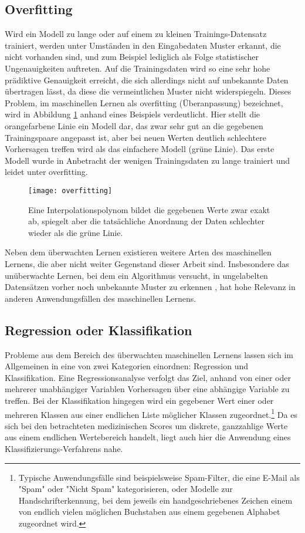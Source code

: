 \subsection{Overfitting}\label{section:overfitting}
Wird ein Modell zu lange oder auf einem zu kleinen Trainings-Datensatz trainiert, werden unter Umständen in den Eingabedaten Muster erkannt, die nicht vorhanden sind, und zum Beispiel lediglich als Folge statistischer Ungenauigkeiten auftreten. Auf die Trainingsdaten wird so eine sehr hohe prädiktive Genauigkeit erreicht, die sich allerdings nicht auf unbekannte Daten übertragen lässt, da diese die vermeintlichen Muster nicht widerspiegeln. Dieses Problem, im maschinellen Lernen als overfitting (Überanpassung) bezeichnet, wird in Abbildung \ref{fig:overfitting} anhand eines Beispiels verdeutlicht. Hier stellt die orangefarbene Linie ein Modell dar, das zwar sehr gut an die gegebenen Trainingspaare angepasst ist, aber bei neuen Werten deutlich schlechtere Vorhersagen treffen wird als das einfachere Modell (grüne Linie). Das erste Modell wurde in Anbetracht der wenigen Trainingsdaten zu lange trainiert und leidet unter overfitting.

\begin{figure}[htb]
    \centering
    \texttt{[image: overfitting]}
    \caption{Eine Interpolationspolynom bildet die gegebenen Werte zwar exakt ab, spiegelt aber die tatsächliche Anordnung der Daten schlechter wieder als die grüne Linie.}
    \label{fig:overfitting}
\end{figure} %

Neben dem überwachten Lernen existieren weitere Arten des maschinellen Lernens, die aber nicht weiter Gegenstand dieser Arbeit sind. Insbesondere das unüberwachte Lernen, bei dem ein Algorithmus versucht, in ungelabelten Datensätzen vorher noch unbekannte Muster zu erkennen \citep{russellArtificialIntelligenceModern2020}, hat hohe Relevanz in anderen Anwendungsfällen des maschinellen Lernens.

\subsection{Regression oder Klassifikation}\label{section:regrvsclf}
Probleme aus dem Bereich des überwachten maschinellen Lernens lassen sich im Allgemeinen in eine von zwei Kategorien einordnen: Regression und Klassifikation. Eine Regressionsanalyse verfolgt das Ziel, anhand von einer oder mehrerer unabhängiger Variablen Vorhersagen über eine abhängige Variable zu treffen. Bei der Klassifikation hingegen wird ein gegebener Wert einer oder mehreren Klassen aus einer endlichen Liste möglicher Klassen zugeordnet.\footnote{Typische Anwendungsfälle sind beispielsweise Spam-Filter, die eine E-Mail als "Spam" oder "Nicht Spam" kategorisieren, oder Modelle zur Handschrifterkennung, bei dem jeweils ein handgeschriebenes Zeichen einem von endlich vielen möglichen Buchstaben aus einem gegebenen Alphabet zugeordnet wird.}
Da es sich bei den betrachteten medizinischen Scores um diskrete, ganzzahlige Werte aus einem endlichen Wertebereich handelt, liegt auch hier die Anwendung eines Klassifizierungs-Verfahrens nahe.

